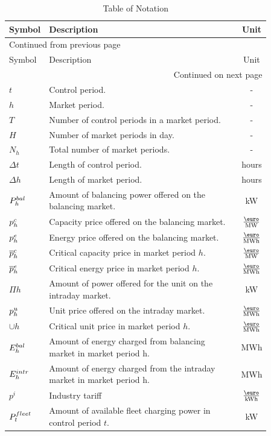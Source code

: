 \documentclass[a4paper, 12pt]{article}
\begin{document}
\begin{longtable}{p{0.11\linewidth}|p{0.75\linewidth}|c}
\caption[Table of Notation]{Table of Notation \label{table-notation}}
\\
\hline
\hline
Symbol & Description & Unit\\
\hline
\endfirsthead
\multicolumn{3}{l}{Continued from previous page} \\
\hline

Symbol & Description & Unit \\

\hline
\endhead
\hline\multicolumn{3}{r}{Continued on next page} \\
\endfoot
\endlastfoot
\hline
\(t\) & Control period. & -\\
\(h\) & Market period. & -\\
\(T\) & Number of control periods in a market period. & -\\
\(H\) & Number of market periods in day. & -\\
\(N_h\) & Total number of market periods. & -\\
\(\Delta t\) & Length of control period. & hours\\
\(\Delta h\) & Length of market period. & hours\\
\hline
\(P^{bal}_{h}\) & Amount of balancing power offered on the balancing market. & kW\\
\(p^c_{h}\) & Capacity price offered on the balancing market. & \(\emw\)\\
\(p^e_{h}\) & Energy price offered on the balancing market. & \(\emwh\)\\
\(\overline p^c_{h}\) & Critical capacity price in market period \(h\). & \(\emw\)\\
\(\overline p^e_{h}\) & Critical energy price in market period \(h\). & \(\emwh\)\\
\hline
\(\Pi{h}\) & Amount of power offered for the unit on the intraday market. & kW\\
\(p^u_{h}\) & Unit price offered on the intraday market. & \(\emwh\)\\
\(\cup{h}\) & Critical unit price in market period \(h\). & \(\emwh\)\\
\hline
\(E^{bal}_{h}\) & Amount of energy charged from balancing market in market period h. & MWh\\
\(E^{intr}_{h}\) & Amount of energy charged from the intraday market in market period h. & MWh\\
\(p^{i}\) & Industry tariff & \(\ekwh\)\\
\hline
\(P^{fleet}_{t}\) & Amount of available fleet charging power in control period \(t\). & kW\\

\end{longtable}
\end{document}
